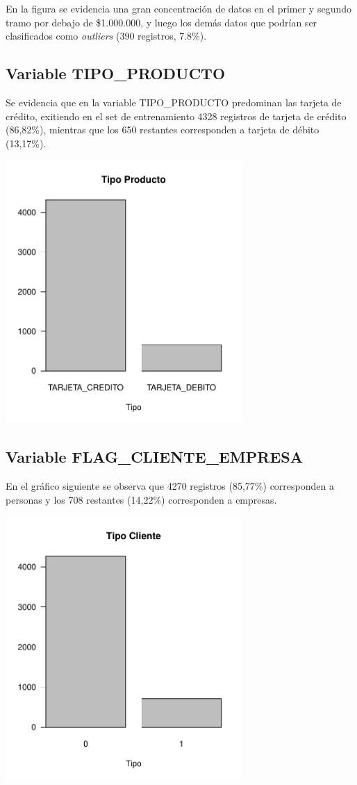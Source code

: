 \documentclass[
	11pt, %
	spanish, %
]{fphw}
\begin{document}
En la figura se evidencia una gran concentración de datos en el primer y segundo tramo por debajo de \$1.000.000, y luego los demás datos que podrían ser clasificados como \textit{outliers} (390 registros, 7.8\%).


\newpage
\subsection*{Variable TIPO\_PRODUCTO}
Se evidencia que en la variable TIPO\_PRODUCTO predominan las tarjeta de crédito, exitiendo en el set de entrenamiento 4328 registros de tarjeta de crédito (86,82\%), mientras que los 650 restantes corresponden a tarjeta de débito (13,17\%).
\begin{center}
	\includegraphics[width=9cm]{tipo_prod.pdf}
\end{center}



\subsection*{Variable FLAG\_CLIENTE\_EMPRESA}
En el gráfico siguiente se observa que 4270 registros (85,77\%) corresponden a personas y los 708 restantes (14,22\%) corresponden a empresas.
\begin{center}
	\includegraphics[width=9cm]{tipo_cliente.pdf}
\end{center}
\end{document}
